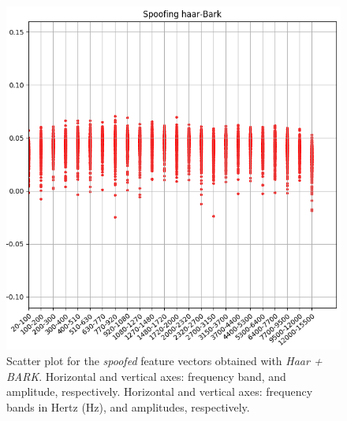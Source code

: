 \begin{figure}[H]
\centering
\includegraphics[scale=.53]{images/results/barkVersusMel/spoofingHaarBark}
\caption{Scatter plot for the \textit{spoofed} feature vectors obtained with \textit{Haar + BARK}. Horizontal and vertical axes: frequency band, and amplitude, respectively. Horizontal and vertical axes: frequency bands in Hertz (Hz), and amplitudes, respectively.}
\label{fig:spoofinghaarbark}
\end{figure}
